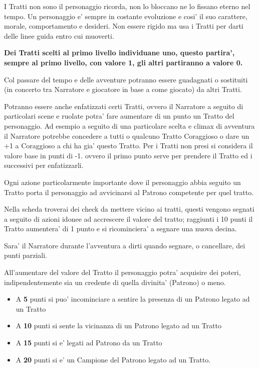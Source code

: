 \documentclass[a4paper,11pt,twoside,openany]{book}
\begin{document}
I Tratti non sono il personaggio ricorda, non lo bloccano ne lo fissano eterno nel tempo. Un personaggio e' sempre in costante evoluzione e cosi' il suo carattere, morale, comportamento e desideri. Non essere rigido ma usa i Tratti per darti delle linee guida entro cui muoverti.

\textbf{Dei Tratti scelti al primo livello individuane uno, questo partira', sempre al primo livello, con valore 1, gli altri partiranno a valore 0.}

Col passare del tempo e delle avventure potranno essere guadagnati o sostituiti (in concerto tra Narratore e giocatore in base a come giocato) da altri Tratti.

Potranno essere anche enfatizzati certi Tratti, ovvero il Narratore a seguito di particolari scene e ruolate potra' fare aumentare di un punto un Tratto del personaggio. Ad esempio a seguito di una particolare scelta e climax di avventura il Narratore potrebbe concedere a tutti o qualcuno Tratto Coraggioso o dare un +1 a Coraggioso a chi ha gia' questo Tratto. Per i Tratti non presi si considera il valore base in punti di -1. ovvero il primo punto serve per prendere il Tratto ed i successivi per enfatizzarli.

Ogni azione particolarmente importante dove il personaggio abbia seguito un Tratto porta il personaggio ad avvicinarsi al Patrono competente per quel tratto.

Nella scheda troverai dei check da mettere vicino ai tratti, questi vengono segnati a seguito di azioni idonee ad accrescere il valore del tratto; raggiunti i 10 punti il Tratto aumentera' di 1 punto e si ricominciera' a segnare una nuova decina.

Sara' il Narratore durante l'avventura a dirti quando segnare, o cancellare, dei punti parziali.

All'aumentare del valore del Tratto il personaggio potra' acquisire dei poteri, indipendentemente sia un credente di quella divinita'
(Patrono) o meno.

\begin{itemize}
	\item A \textbf{5} punti si puo' incominciare a sentire la presenza di un Patrono
legato ad un Tratto
	\item A \textbf{10} punti si sente la vicinanza di un Patrono legato ad un Tratto
	\item A \textbf{15} punti si e' legati ad Patrono da un Tratto
	\item A \textbf{20} punti si e' un Campione del Patrono legato ad un Tratto.
\end{itemize}
\end{document}
